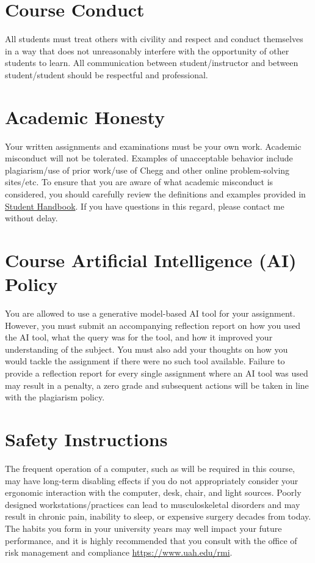 \documentclass[11pt]{report}
\begin{document}
\chapter{Course Conduct}
All students must treat others with civility and respect and conduct themselves in a way that does not unreasonably interfere with the opportunity of other students to learn. All communication between student/instructor and between student/student should be respectful and professional.

\chapter{Academic Honesty}
Your written assignments and examinations must be your own work. Academic misconduct will not be tolerated. Examples of unacceptable behavior include plagiarism/use of prior work/use of Chegg and other online problem-solving sites/etc. To ensure that you are aware of what academic misconduct is considered, you should carefully review the definitions and examples provided in \href{https://www.uah.edu/dos/office-of-student-ethics-education/handbook}{Student Handbook}. If you have questions in this regard, please contact me without delay.

\chapter{Course Artificial Intelligence (AI) Policy}
You are allowed to use a generative model-based AI tool for your assignment. However, you must submit an accompanying reflection report on how you used the AI tool, what the query was for the tool, and how it improved your understanding of the subject. You must also add your thoughts on how you would tackle the assignment if there were no such tool available. Failure to provide a reflection report for every single assignment where an AI tool was used may result in a penalty, a zero grade and subsequent actions will be taken in line with the plagiarism policy.


\chapter{Safety Instructions}
The frequent operation of a computer, such as will be required in this course, may have long-term disabling effects if you do not appropriately consider your ergonomic interaction with the computer, desk, chair, and light sources. Poorly designed workstations/practices can lead to musculoskeletal disorders and may result in chronic pain, inability to sleep, or expensive surgery decades from today. The habits you form in your university years may well impact your future performance, and it is highly recommended that you consult with the office of risk management and compliance \href{https://www.uah.edu/rmi}{https://www.uah.edu/rmi}.
\end{document}
